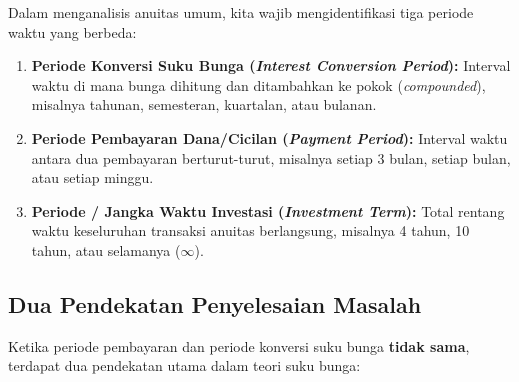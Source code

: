 \documentclass[11pt,a4paper]{article}
\begin{document}
\begin{definitionbox}
Dalam menganalisis anuitas umum, kita wajib mengidentifikasi tiga periode waktu yang berbeda:
\begin{enumerate}[label=\textbf{\arabic*.}]
    \item \textbf{Periode Konversi Suku Bunga (\textit{Interest Conversion Period}):} Interval waktu di mana bunga dihitung dan ditambahkan ke pokok (\textit{compounded}), misalnya tahunan, semesteran, kuartalan, atau bulanan.
    \item \textbf{Periode Pembayaran Dana/Cicilan (\textit{Payment Period}):} Interval waktu antara dua pembayaran berturut-turut, misalnya setiap 3 bulan, setiap bulan, atau setiap minggu.
    \item \textbf{Periode / Jangka Waktu Investasi (\textit{Investment Term}):} Total rentang waktu keseluruhan transaksi anuitas berlangsung, misalnya 4 tahun, 10 tahun, atau selamanya ($\infty$).
\end{enumerate}
\end{definitionbox}

\subsection{Dua Pendekatan Penyelesaian Masalah}

Ketika periode pembayaran dan periode konversi suku bunga \textbf{tidak sama}, terdapat dua pendekatan utama dalam teori suku bunga:

\begin{center}
\end{center}
\end{document}
